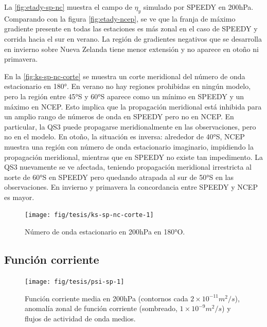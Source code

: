 \documentclass[spanish,a4paper,12pt,oneside]{book}
\begin{document}
La \autoref{fig:etady-sp-nc} muestra el campo de \(\eta_{y}\) simulado
por SPEEDY en 200hPa. Comparando con la figura \autoref{fig:etady-ncep},
se ve que la franja de máximo gradiente presente en todas las estaciones
es más zonal en el caso de SPEEDY y corrida hacia el sur en verano. La
región de gradientes negativos que se desarrolla en invierno sobre Nueva
Zelanda tiene menor extensión y no aparece en otoño ni primavera.

En la \autoref{fig:ks-sp-nc-corte} se muestra un corte meridional del
número de onda estacionario en 180°. En verano no hay regiones
prohibidas en ningún modelo, pero la región entre 45°S y 60°S aparece
como un mínimo en SPEEDY y un máximo en NCEP. Esto implica que la
propagación meridional está inhibida para un amplio rango de números de
onda en SPEEDY pero no en NCEP. En particular, la QS3 puede propagarse
meridionalmente en las observaciones, pero no en el modelo. En otoño, la
situación es inversa: alrededor de 40°S, NCEP muestra una región con
número de onda estacionario imaginario, impidiendo la propagación
meridional, mientras que en SPEEDY no existe tan impedimento. La QS3
nuevamente se ve afectada, teniendo propagación meridional irrestricta
al norte de 60°S en SPEEDY pero quedando atrapada al sur de 50°S en las
observaciones. En invierno y primavera la concordancia entre SPEEDY y
NCEP es mayor.

\begin{figure}
\texttt{[image: fig/tesis/ks-sp-nc-corte-1]} \caption{Número de onda estacionario en 200hPa en 180°O.}\label{fig:ks-sp-nc-corte}
\end{figure}

\subsection{Función corriente}\label{funcion-corriente-2}

\begin{landscape}\begin{figure}

{\centering \texttt{[image: fig/tesis/psi-sp-1]} 

}

\caption{Función corriente media en 200hPa (contornos cada $2\times10^{-11}m^2/s$), anomalía zonal de función corriente (sombreado,  $1\times10^{-9}m^2/s$) y flujos de actividad de onda medios.}\label{fig:psi-sp}
\end{figure}
\end{landscape}
\end{document}
